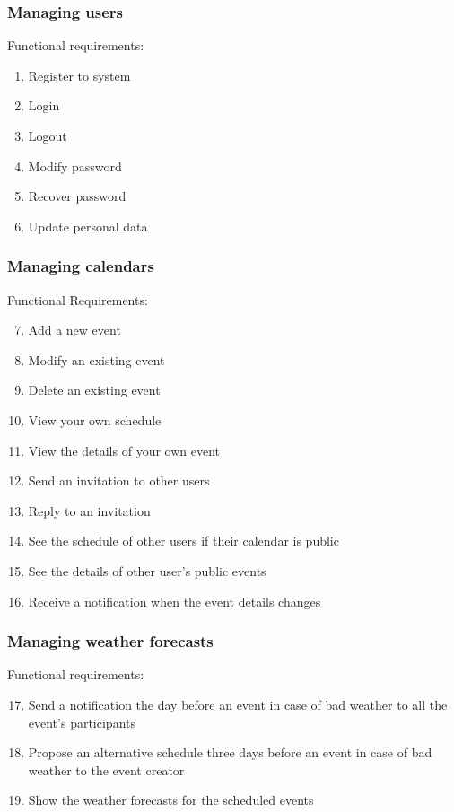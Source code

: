 \documentclass[10pt,a4paper,titlepage]{article}
\begin{document}
\subsubsection{Managing users}
Functional requirements:
\begin{enumerate}[label = FR \arabic*:]
\item Register to system
\item Login
\item Logout
\item Modify password
\item Recover password
\item Update personal data
\end{enumerate}

\subsubsection{Managing calendars}
Functional Requirements:
\begin{enumerate}[label = FR \arabic*:]
\setcounter{enumi}{6}
\item Add a new event
\item Modify an existing event
\item Delete an existing event
\item View your own schedule 
\item View the details of your own event
\item Send an invitation to other users
\item Reply to an invitation
\item See the schedule of other users if their calendar is public
\item See the details of other user's public events
\item Receive a notification when the event details changes
\end{enumerate}

\subsubsection{Managing weather forecasts}
Functional requirements:
\begin{enumerate}[label = FR \arabic*:]
\setcounter{enumi}{16}
\item Send a notification the day before an event in case of bad weather to all the event's participants
\item Propose an alternative schedule three days before an event in case of bad weather to the event creator
\item Show the weather forecasts for the scheduled events 
\end{enumerate}
\end{document}
